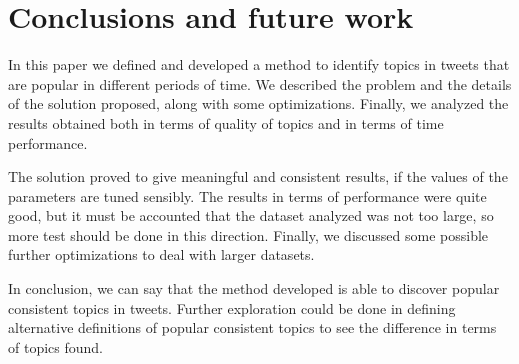 \section{Conclusions and future work} 
\label{sec:con}

In this paper we defined and developed a method to identify 
topics in tweets that are popular in different periods of time.
We described the problem and the details of the solution proposed, 
along with some optimizations. Finally, we analyzed the results obtained
both in terms of quality of topics and in terms of time performance.

The solution proved to give meaningful and consistent results, if the 
values of the parameters are tuned sensibly. The results in terms of 
performance were quite good, but it must be accounted that the dataset 
analyzed was not too large, so more test should be done in this direction.
Finally, we discussed some possible further optimizations to deal with 
larger datasets.

In conclusion, we can say that the method developed is able to 
discover popular consistent topics in tweets. Further exploration could be 
done in defining alternative definitions of popular consistent topics to 
see the difference in terms of topics found.